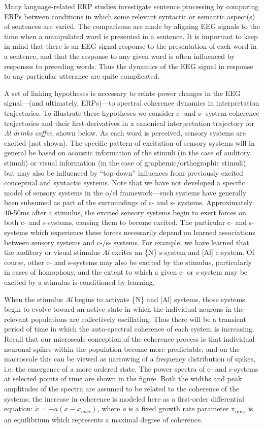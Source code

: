   Many language-related ERP studies investigate sentence processing by comparing ERPs between conditions in which some relevant syntactic or semantic aspect(s) of sentences are varied. The comparisons are made by aligning EEG signals to the time when a manipulated word is presented in a sentence. It is important to keep in mind that there is an EEG signal response to the presentation of each word in a sentence, and that the response to any given word is often influenced by responses to preceding words. Thus the dynamics of the EEG signal in response to any particular utterance are quite complicated. 

A set of linking hypotheses is necessary to relate power changes in the EEG signal—(and ultimately, ERPs)—to spectral coherence dynamics in interpretation trajectories. To illustrate these hypotheses we consider c- and s- system coherence trajectories and their first-derivatives in a canonical interpretation trajectory for \textit{Al drinks coffee}, shown below. As each word is perceived, sensory systems are excited (not shown). The specific pattern of excitation of sensory systems will in general be based on acoustic information of the stimuli (in the case of auditory stimuli) or visual information (in the case of graphemic/orthographic stimuli), but may also be influenced by “top-down” influences from previously excited conceptual and syntactic systems. Note that we have not developed a specific model of sensory systems in the o/el framework—such systems have generally been subsumed as part of the surroundings of c- and s- systems. Approximately 40-50ms after a stimulus, the excited sensory systems begin to exert forces on both c- and s-systems, causing them to become excited. The particular c- and s-systems which experience these forces necessarily depend on learned associations between sensory systems and c-/s- systems. For example, we have learned that the auditory or visual stimulus \textit{Al} excites an \{N\} s-system and [Al] c-system. Of course, other c- and s-systems may also be excited by the stimulus, particularly in cases of homophony, and the extent to which a given c- or s-system may be excited by a stimulus is conditioned by learning.

  When the stimulus \textit{Al} begins to activate \{N\} and [Al] systems, those systems begin to evolve toward an active state in which the individual neurons in the relevant populations are collectively oscillating. Thus there will be a transient period of time in which the auto-spectral coherence of each system is increasing. Recall that our microscale conception of the coherence process is that individual neuronal spikes within the population become more predictable, and on the macroscale this can be viewed as narrowing of a frequency distribution of spikes, i.e. the emergence of a more ordered state. The power spectra of c- and s-systems at selected points of time are shown in the figure. Both the widths and peak amplitudes of the spectra are assumed to be related to the coherence of the systems; the increase in coherence is modeled here as a first-order differential equation:  $\acute{{x}}=-a\left(x-{x}_{\mathit{max}}\right)$, where \textit{a} is a fixed growth rate parameter x\textsubscript{max} is an equilibrium which represents a maximal degree of coherence. 

